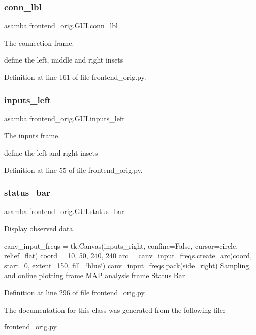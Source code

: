 \subsubsection{\texorpdfstring{conn\+\_\+lbl}{conn\_lbl}}
{\footnotesize\ttfamily asamba.\+frontend\+\_\+orig.\+G\+U\+I.\+conn\+\_\+lbl}



The connection frame. 

define the left, middle and right insets 

Definition at line 161 of file frontend\+\_\+orig.\+py.

\mbox{\label{classasamba_1_1frontend__orig_1_1_g_u_i_a0c7f18b731c65f48e9cc27399e21363c}} 
\subsubsection{\texorpdfstring{inputs\+\_\+left}{inputs\_left}}
{\footnotesize\ttfamily asamba.\+frontend\+\_\+orig.\+G\+U\+I.\+inputs\+\_\+left}



The inputs frame. 

define the left and right insets 

Definition at line 55 of file frontend\+\_\+orig.\+py.

\mbox{\label{classasamba_1_1frontend__orig_1_1_g_u_i_a740ec5fcacbc2e7b4fa0ea061b52d411}} 
\subsubsection{\texorpdfstring{status\+\_\+bar}{status\_bar}}
{\footnotesize\ttfamily asamba.\+frontend\+\_\+orig.\+G\+U\+I.\+status\+\_\+bar}



Display observed data. 

canv\+\_\+input\+\_\+freqs = tk.\+Canvas(inputs\+\_\+right, confine=False, cursor=\textquotesingle{}circle\textquotesingle{}, relief=\textquotesingle{}flat\textquotesingle{}) coord = 10, 50, 240, 240 arc = canv\+\_\+input\+\_\+freqs.\+create\+\_\+arc(coord, start=0, extent=150, fill=\char`\"{}blue\char`\"{}) canv\+\_\+input\+\_\+freqs.\+pack(side=\textquotesingle{}right\textquotesingle{}) Sampling, and online plotting frame M\+AP analysis frame Status Bar 

Definition at line 296 of file frontend\+\_\+orig.\+py.



The documentation for this class was generated from the following file\+:\begin{DoxyCompactItemize}
\item 
frontend\+\_\+orig.\+py\end{DoxyCompactItemize}
